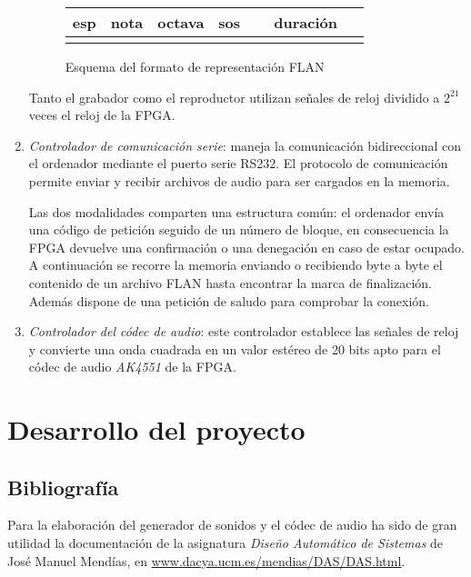 \documentclass{article}
\begin{document}
\begin{enumerate}
	\begin{figure}[ht] \centering
		\begin{tabular}{| l | l | l | l | l | l | l | l | l | l | l | l | l | l | l | l |}
			\hline esp & \multicolumn{3}{c|}{nota} & \multicolumn{3}{c|}{octava} & sos & \multicolumn{8}{c|}{duración} \\ \hline
			& & & & & & & & & & & & & & & \\ \hline
		\end{tabular}

		\label{fig:flan}
		\caption{Esquema del formato de representación FLAN}
	\end{figure}

	Tanto el grabador como el reproductor utilizan señales de reloj dividido a $2^{21}$ veces el reloj de la FPGA.

	\item {\itshape Controlador de comunicación serie}: maneja la comunicación bidireccional con el ordenador mediante el puerto serie RS232. El protocolo de comunicación permite enviar y recibir archivos de audio para ser cargados en la memoria.

	Las dos modalidades comparten una estructura común: el ordenador envía una código de petición seguido de un número de bloque, en consecuencia la FPGA devuelve una confirmación o una denegación en caso de estar ocupado. A continuación se recorre la memoria enviando o recibiendo byte a byte el contenido de un archivo FLAN hasta encontrar la marca de finalización. Además dispone de una petición de saludo para comprobar la conexión.

	\item {\itshape Controlador del códec de audio}: este controlador establece las señales de reloj y convierte una onda cuadrada en un valor estéreo de 20 bits apto para el códec de audio {\itshape AK4551} de la FPGA.
\end{enumerate}

\section{Desarrollo del proyecto}

\subsection{Bibliografía}
	Para la elaboración del generador de sonidos y el códec de audio ha sido de gran utilidad la documentación de la asignatura {\itshape Diseño Automático de Sistemas} de José Manuel Mendías, en \url{www.dacya.ucm.es/mendias/DAS/DAS.html}.
\end{document}
